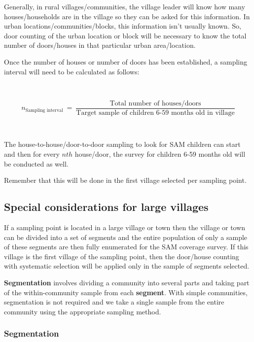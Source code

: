 \documentclass[12pt,a4paper]{book}
\theoremstyle{definition}
\theoremstyle{definition}
\theoremstyle{definition}
\theoremstyle{remark}
\begin{document}
Generally, in rural villages/communities, the village leader will know
how many houses/households are in the village so they can be asked for
this information. In urban locations/communities/blocks, this
information isn't usually known. So, door counting of the urban location
or block will be necessary to know the total number of doors/houses in
that particular urban area/location.

Once the number of houses or number of doors has been established, a
sampling interval will need to be calculated as follows:

~

\[ n_{\text{Sampling interval}} ~ = ~ \frac{\text{Total number of houses/doors}}{\text{Target sample of children 6-59 months old in village}} \]

~

The house-to-house/door-to-door sampling to look for SAM children can
start and then for every \(nth\) house/door, the survey for children
6-59 months old will be conducted as well.

Remember that this will be done in the first village selected per
sampling point.

\hypertarget{special-considerations-for-large-villages}{%
\subsection{Special considerations for large
villages}\label{special-considerations-for-large-villages}}

If a sampling point is located in a large village or town then the
village or town can be divided into a set of segments and the entire
population of only a sample of these segments are then fully enumerated
for the SAM coverage survey. If this village is the first village of the
sampling point, then the door/house counting with systematic selection
will be applied only in the sample of segments selected.

\textbf{Segmentation} involves dividing a community into several parts
and taking part of the within-community sample from each
\textbf{segment}. With simple communities, segmentation is not required
and we take a single sample from the entire community using the
appropriate sampling method.

\hypertarget{segmentation}{%
\subsubsection{Segmentation}\label{segmentation}}
\end{document}
